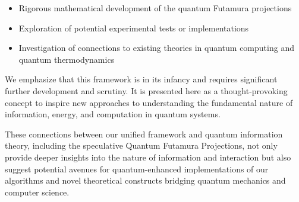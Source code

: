 \begin{itemize}
    \item Rigorous mathematical development of the quantum Futamura projections
    \item Exploration of potential experimental tests or implementations
    \item Investigation of connections to existing theories in quantum computing and quantum thermodynamics
\end{itemize}

We emphasize that this framework is in its infancy and requires significant further development and scrutiny. It is presented here as a thought-provoking concept to inspire new approaches to understanding the fundamental nature of information, energy, and computation in quantum systems.

These connections between our unified framework and quantum information theory, including the speculative Quantum Futamura Projections, not only provide deeper insights into the nature of information and interaction but also suggest potential avenues for quantum-enhanced implementations of our algorithms and novel theoretical constructs bridging quantum mechanics and computer science.



